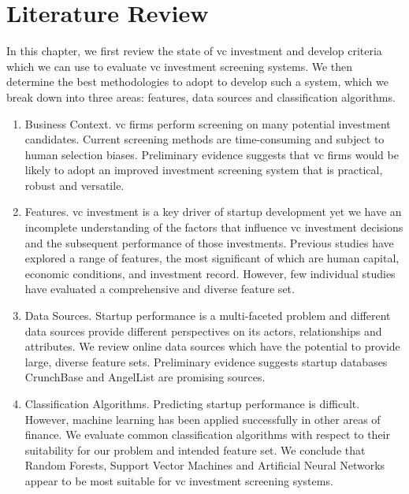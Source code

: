 \documentclass[../thesis/thesis.tex]{subfiles}
\begin{document}
\chapter{Literature Review}
\label{chap:litreview}

In this chapter, we first review the state of \gls{vc} investment and develop criteria which we can use to evaluate \gls{vc} investment screening systems. We then determine the best methodologies to adopt to develop such a system, which we break down into three areas: features, data sources and classification algorithms.

\begin{enumerate}

\item Business Context. \Gls{vc} firms perform screening on many potential investment candidates. Current screening methods are time-consuming and subject to human selection biases. Preliminary evidence suggests that \gls{vc} firms would be likely to adopt an improved investment screening system that is practical, robust and versatile.

\item Features. \Gls{vc} investment is a key driver of startup development yet we have an incomplete understanding of the factors that influence \gls{vc} investment decisions and the subsequent performance of those investments. Previous studies have explored a range of features, the most significant of which are human capital, economic conditions, and investment record. However, few individual studies have evaluated a comprehensive and diverse feature set.

\item Data Sources. Startup performance is a multi-faceted problem and different data sources provide different perspectives on its actors, relationships and attributes. We review online data sources which have the potential to provide large, diverse feature sets. Preliminary evidence suggests startup databases CrunchBase and AngelList are promising sources.

\item Classification Algorithms. Predicting startup performance is difficult. However, machine learning has been applied successfully in other areas of finance. We evaluate common classification algorithms with respect to their suitability for our problem and intended feature set. We conclude that Random Forests, Support Vector Machines and Artificial Neural Networks appear to be most suitable for \gls{vc} investment screening systems.

\end{enumerate}
\end{document}
